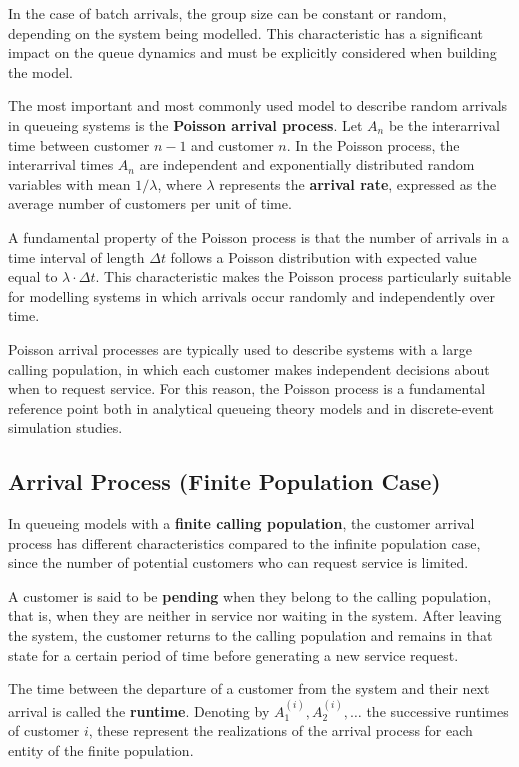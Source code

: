 In the case of batch arrivals, the group size can be constant or random, depending on the system being modelled. This characteristic has a significant impact on the queue dynamics and must be explicitly considered when building the model.

The most important and most commonly used model to describe random arrivals in queueing systems is the \textbf{Poisson arrival process}. Let $A_n$ be the interarrival time between customer $n-1$ and customer $n$. In the Poisson process, the interarrival times $A_n$ are independent and exponentially distributed random variables with mean $1/\lambda$, where $\lambda$ represents the \textbf{arrival rate}, expressed as the average number of customers per unit of time.

A fundamental property of the Poisson process is that the number of arrivals in a time interval of length $\Delta t$ follows a Poisson distribution with expected value equal to $\lambda \cdot \Delta t$. This characteristic makes the Poisson process particularly suitable for modelling systems in which arrivals occur randomly and independently over time.

Poisson arrival processes are typically used to describe systems with a large calling population, in which each customer makes independent decisions about when to request service. For this reason, the Poisson process is a fundamental reference point both in analytical queueing theory models and in discrete-event simulation studies.

\subsection{Arrival Process (Finite Population Case)}

In queueing models with a \textbf{finite calling population}, the customer arrival process has different characteristics compared to the infinite population case, since the number of potential customers who can request service is limited.

A customer is said to be \textbf{pending} when they belong to the calling population, that is, when they are neither in service nor waiting in the system. After leaving the system, the customer returns to the calling population and remains in that state for a certain period of time before generating a new service request.

The time between the departure of a customer from the system and their next arrival is called the \textbf{runtime}. Denoting by $A_1^{(i)}, A_2^{(i)}, \dots$ the successive runtimes of customer $i$, these represent the realizations of the arrival process for each entity of the finite population.

